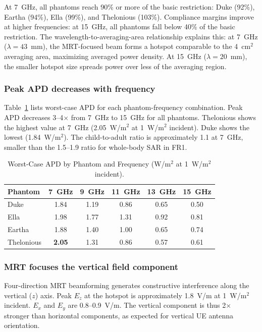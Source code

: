\documentclass{iopjournal}
\begin{document}
At 7~GHz, all phantoms reach 90\% or more of the basic restriction: Duke (92\%), Eartha (94\%), Ella (99\%), and Thelonious (103\%).
Compliance margins improve at higher frequencies: at 15~GHz, all phantoms fall below 40\% of the basic restriction.
The wavelength-to-averaging-area relationship explains this: at 7~GHz ($\lambda = 43$~mm), the \gls{MRT}-focused beam forms a hotspot comparable to the 4~cm$^2$ averaging area, maximizing averaged power density.
At 15~GHz ($\lambda = 20$~mm), the smaller hotspot size spreads power over less of the averaging region.

\subsubsection{Peak APD decreases with frequency}

Table~\ref{table:sapd_fr3} lists worst-case APD for each phantom-frequency combination.
Peak APD decreases 3--4$\times$ from 7~GHz to 15~GHz for all phantoms.
Thelonious shows the highest value at 7~GHz (2.05~W/m$^2$ at 1~W/m$^2$ incident). Duke shows the lowest (1.84~W/m$^2$).
The child-to-adult ratio is approximately 1.1 at 7~GHz, smaller than the 1.5--1.9 ratio for whole-body \gls{SAR} in FR1.

\begin{table}[!t]
\centering
\caption{Worst-Case APD by Phantom and Frequency (W/m$^2$ at 1~W/m$^2$ incident).}
\label{table:sapd_fr3}
\begin{tabular}{@{}lccccc@{}}
\toprule
\textbf{Phantom} & \textbf{7~GHz} & \textbf{9~GHz} & \textbf{11~GHz} & \textbf{13~GHz} & \textbf{15~GHz} \\
\midrule
Duke & 1.84 & 1.19 & 0.86 & 0.65 & 0.50 \\
Ella & 1.98 & 1.77 & 1.31 & 0.92 & 0.81 \\
Eartha & 1.88 & 1.40 & 1.00 & 0.65 & 0.74 \\
Thelonious & \textbf{2.05} & 1.31 & 0.86 & 0.57 & 0.61 \\
\bottomrule
\end{tabular}
\end{table}

\subsubsection{\Gls{MRT} focuses the vertical field component}

Four-direction \gls{MRT} beamforming generates constructive interference along the vertical ($z$) axis.
Peak $E_z$ at the hotspot is approximately 1.8~V/m at 1~W/m$^2$ incident. $E_x$ and $E_y$ are 0.8--0.9~V/m.
The vertical component is thus 2$\times$ stronger than horizontal components, as expected for vertical \gls{UE} antenna orientation.
\end{document}
